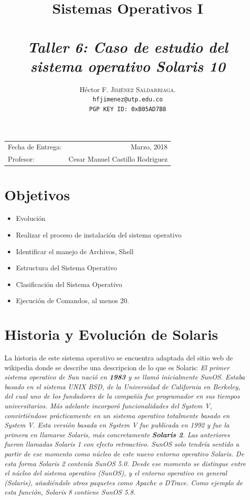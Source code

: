 \documentclass[paper=a4, fontsize=12pt]{article} 		%
\title{Sistemas Operativos I\\ 
\horrule{0.5pt} \\[0.4cm] 								%
\textit{Taller 6: Caso de estudio del sistema operativo Solaris 10}
\horrule{1pt} \\[0.5cm] 			
}
\author{												
Héctor F. \textsc{Jiménez Saldarriaga.}\\				%
\texttt{hfjimenez@utp.edu.co} \\						
\texttt{PGP KEY ID: 0xB05AD7B8}
}
\date{}    						                       %
\numberwithin{equation}{section}						%
\numberwithin{table}{section} 							%
\begin{document}
\maketitle                      			           %
\begin{center}
\begin{tabular}{l r}								   %
Fecha de Entrega: & Marzo, 2018 \\				   %
Profesor: & Cesar Manuel Castillo Rodriguez
\end{tabular}
\end{center}
\section{Objetivos}
\begin{itemize}
	\item Evolución
	\item Realizar el proceso de instalación del sistema operativo	
    \item Identificar el manejo de Archivos, Shell
    \item Estructura del Sistema Operativo
    \item Clasificación del Sistema Operativo
	\item Ejecución de Comandos, al menos 20.
\end{itemize}
\section{Historia y Evolución de Solaris} 
La historia de este sistema operativo se encuentra adaptada  del sitio  web de wikipedia donde se describe una descripcion de lo que es Solaris:
\textit{ El primer sistema operativo de Sun nació en \textbf{1983} y se llamó inicialmente SunOS. Estaba basado en el sistema UNIX BSD, de la Universidad de California en Berkeley, del cual uno de los fundadores de la compañía fue programador en sus tiempos universitarios. Más adelante incorporó funcionalidades del System V, convirtiéndose prácticamente en un sistema operativo totalmente basado en System V. Esta versión basada en System V fue publicada en 1992 y fue la primera en llamarse Solaris, más concretamente \textbf{Solaris 2}. Las anteriores fueron llamadas Solaris 1 con efecto retroactivo. SunOS solo tendría sentido a partir de ese momento como núcleo de este nuevo entorno operativo Solaris. De esta forma Solaris 2 contenía SunOS 5.0. Desde ese momento se distingue entre el núcleo del sistema operativo (SunOS), y el entorno operativo en general (Solaris), añadiéndole otros paquetes como Apache o DTrace. Como ejemplo de esta función, Solaris 8 contiene SunOS 5.8.}
\end{document}
